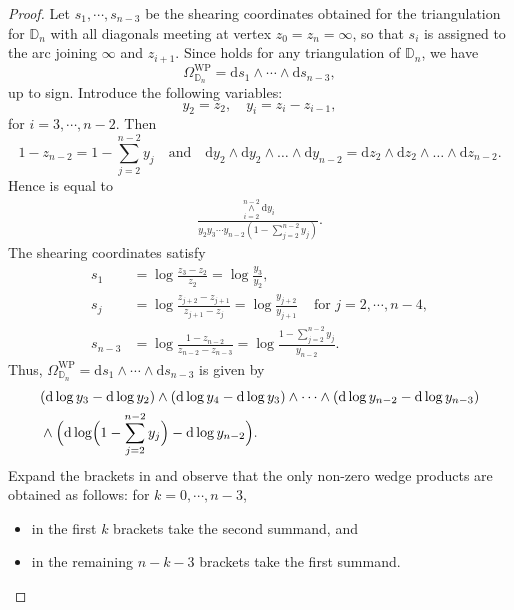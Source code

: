 \documentclass[10pt,a4paper]{amsart}
\begin{document}
\begin{proof}
Let $s_1, \cdots, s_{n-3}$ be the shearing coordinates obtained for the triangulation for $\mathbb{D}_n$ with all diagonals meeting at vertex $z_0 = z_n = \infty$, so that $s_i$ is assigned to the arc joining $\infty$ and $z_{i+1}$. Since  holds for any triangulation of $\mathbb{D}_n$, we have
\[
\Omega^{\mathrm{WP}}_{\mathbb{D}_n}
= 
\mathrm{d}s_1 \wedge \cdots \wedge \mathrm{d}s_{n-3},
\]
up to sign. Introduce the following variables:
\[
y_2 = z_2,
\quad
y_i = z_{i}-z_{i-1},
\]
for $i = 3, \cdots, n-2$. Then 
\[
1-z_{n-2} = 1- \sum_{j=2}^{n-2}y_j
\quad\text{and}\quad 
\mathrm{d}y_2\wedge \mathrm{d}y_2\wedge\ldots\wedge \mathrm{d}y_{n-2}
= 
\mathrm{d}z_2\wedge \mathrm{d}z_2\wedge\ldots\wedge \mathrm{d}z_{n-2}.
\]
Hence  is equal to
\begin{align}
\label{eq: dOmega}
\frac{\mathop{\wedge}\limits_{i=2}^{n-2} \mathrm{d}y_i }{y_2y_3\cdots y_{n-2}(1- \sum_{j=2}^{n-2}y_j)}.
\end{align}
The shearing coordinates satisfy
\begin{align*}
s_1 &= \log \tfrac{z_3-z_2}{z_2} = \log \tfrac{y_3}{y_2},\\
s_j &= \log \tfrac{z_{j+2}-z_{j+1}}{z_{j+1}-z_j} = \log \tfrac{y_{j+2}}{y_{j+1}} \,\quad \text{for }j = 2, \cdots, n-4,\\
s_{n-3} &= \log \tfrac{1-z_{n-2}}{z_{n-2}-z_{n-3}} = \log \tfrac{1- \sum_{j=2}^{n-2}y_j}{y_{n-2}}.
\end{align*}
Thus, $\Omega^{\mathrm{WP}}_{\mathbb{D}_n}=\mathrm{d}s_1 \wedge \cdots \wedge \mathrm{d}s_{n-3}$ is given by
\begin{equation}
\label{eq: dOmega'}
\begin{split}
& (\mathrm{d}\log y_3 - \mathrm{d}\log y_2)
\wedge 
(\mathrm{d}\log y_4 - \mathrm{d}\log y_3) 
\wedge \cdots \wedge 
(\mathrm{d}\log y_{n-2} - \mathrm{d}\log y_{n-3}) \\ 
& \wedge \Bigl(\mathrm{d}\log \Bigl(1- \sum_{j=2}^{n-2}y_j \Bigr) - \mathrm{d}\log y_{n-2} \Bigr).
\end{split}
\end{equation}
Expand the brackets in  and observe that the only non-zero wedge products are obtained as follows: for $k=0,\cdots, n-3$, 
\begin{itemize}
\item in the first $k$ brackets take the second summand, and
\item in the remaining $n-k-3$ brackets take the first summand.

\end{itemize}
\end{proof}
\end{document}
